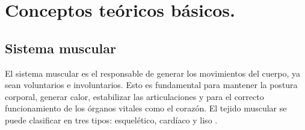 



\section{Conceptos teóricos básicos.}



\subsection{Sistema muscular}

El sistema muscular es el responsable de generar los movimientos del cuerpo, ya sean voluntarios e involuntarios. Esto es fundamental para mantener la postura corporal, generar calor, estabilizar las articulaciones y para el correcto funcionamiento de los órganos vitales como el corazón. 
El tejido muscular se puede clasificar en tres tipos: esquelético, cardíaco y liso \cite{alma991000263829705771}.


